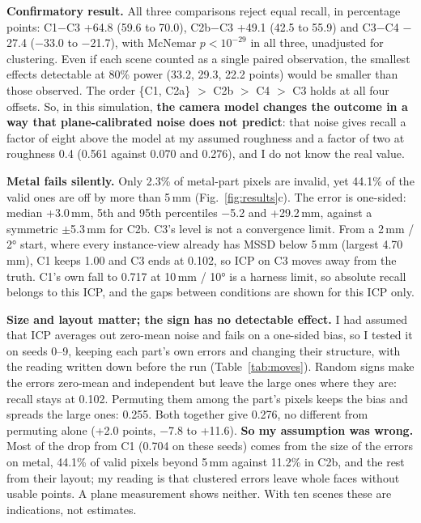 \documentclass[10pt,a4paper]{article}
\newcommand{\para}[1]{\textbf{#1}\enspace}
\begin{document}
\para{Confirmatory result.} All three comparisons reject equal recall, in percentage points: C1$-$C3 +64.8 (59.6 to 70.0), C2b$-$C3 +49.1 (42.5 to 55.9) and C3$-$C4 $-$27.4 ($-$33.0 to $-$21.7), with McNemar $p<10^{-29}$ in all three, unadjusted for clustering. Even if each scene counted as a single paired observation, the smallest effects detectable at 80\% power (33.2, 29.3, 22.2 points) would be smaller than those observed. The order \{C1, C2a\} $>$ C2b $>$ C4 $>$ C3 holds at all four offsets. So, in this simulation, \textbf{the camera model changes the outcome in a way that plane-calibrated noise does not predict}: that noise gives recall a factor of eight above the model at my assumed roughness and a factor of two at roughness 0.4 (0.561 against 0.070 and 0.276), and I do not know the real value.

\para{Metal fails silently.} Only 2.3\% of metal-part pixels are invalid, yet 44.1\% of the valid ones are off by more than 5\,mm (Fig.~\ref{fig:results}c). The error is one-sided: median +3.0\,mm, 5th and 95th percentiles $-$5.2 and +29.2\,mm, against a symmetric $\pm$5.3\,mm for C2b. C3's level is not a convergence limit. From a 2\,mm / 2° start, where every instance-view already has MSSD below 5\,mm (largest 4.70\,mm), C1 keeps 1.00 and C3 ends at 0.102, so ICP on C3 moves away from the truth. C1's own fall to 0.717 at 10\,mm / 10° is a harness limit, so absolute recall belongs to this ICP, and the gaps between conditions are shown for this ICP only.

\para{Size and layout matter; the sign has no detectable effect.} I had assumed that ICP averages out zero-mean noise and fails on a one-sided bias, so I tested it on seeds 0--9, keeping each part's own errors and changing their structure, with the reading written down before the run (Table~\ref{tab:moves}). Random signs make the errors zero-mean and independent but leave the large ones where they are: recall stays at 0.102. Permuting them among the part's pixels keeps the bias and spreads the large ones: 0.255. Both together give 0.276, no different from permuting alone (+2.0 points, $-$7.8 to +11.6). \textbf{So my assumption was wrong.} Most of the drop from C1 (0.704 on these seeds) comes from the size of the errors on metal, 44.1\% of valid pixels beyond 5\,mm against 11.2\% in C2b, and the rest from their layout; my reading is that clustered errors leave whole faces without usable points. A plane measurement shows neither. With ten scenes these are indications, not estimates.
\end{document}
